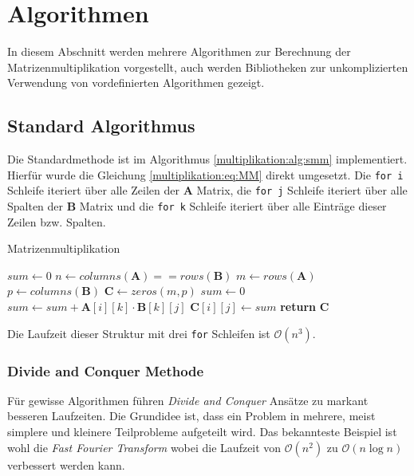 %
%
%

\section{Algorithmen}

In diesem Abschnitt werden mehrere Algorithmen zur Berechnung der Matrizenmultiplikation vorgestellt, auch werden Bibliotheken zur unkomplizierten Verwendung von vordefinierten Algorithmen gezeigt.

\subsection{Standard Algorithmus}

Die Standardmethode ist im Algorithmus \ref{multiplikation:alg:smm} implementiert.
Hierf\"ur wurde die Gleichung \eqref{multiplikation:eq:MM} direkt umgesetzt.
Die \texttt{for i} Schleife iteriert \"uber alle Zeilen der $\mathbf{A}$ Matrix, die \texttt{for j} Schleife iteriert \"uber alle Spalten der $\mathbf{B}$ Matrix und die \texttt{for k} Schleife iteriert \"uber alle Eintr\"age dieser Zeilen bzw. Spalten.
\begin{algorithm}\footnotesize\caption{Matrizenmultiplikation}
	\label{multiplikation:alg:smm}
	\setlength{\lineskip}{7pt}
	\begin{algorithmic}[1]
		\State $sum \gets 0$
		\State $n \gets columns(\textbf{A}) == rows(\textbf{B})$
		\State $m \gets rows(\textbf{A})$
		\State $p \gets columns(\textbf{B})$
		\State $\textbf{C} \gets zeros(m,p)$
		\State $sum \gets 0$
		\State $sum \gets  sum + \textbf{A}[i][k] \cdot \textbf{B}[k][j]$
		\EndFor
		\State $\textbf{C}[i][j] \gets  sum $
		\EndFor
		\EndFor
		\State \textbf{return} $\textbf{C}$
		\EndFunction
	\end{algorithmic}
\end{algorithm}
Die Laufzeit dieser Struktur mit drei \texttt{for} Schleifen ist $\mathcal{O} (n^3)$.

\subsubsection{Divide and Conquer Methode}

F\"ur gewisse Algorithmen f\"uhren \textit{Divide and Conquer}  Ans\"atze \cite{multiplikation:DAC} zu markant besseren Laufzeiten.
Die Grundidee ist, dass ein Problem in mehrere, meist simplere und kleinere Teilprobleme aufgeteilt wird.
Das bekannteste Beispiel ist wohl die \textit{Fast Fourier Transform} wobei die Laufzeit von $\mathcal{O} (n^2)$ zu $\mathcal{O}(n \log n)$ verbessert werden kann.

